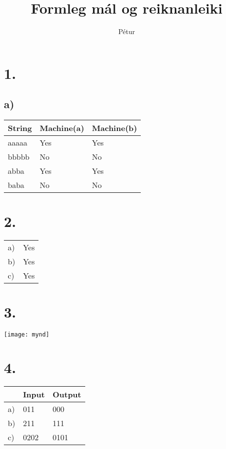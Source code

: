 \documentclass[]{article}
\begin{document}
\title{Formleg mál og reiknanleiki}
\author{Pétur}
\maketitle

\section*{1.}

\subsection*{a)}

\begin{tabular}{ l|l|l }
  String & Machine(a) & Machine(b) \\ \hline
  aaaaa & 	Yes 	& Yes \\
  bbbbb  & 	No	 	& No \\
  abba	&	Yes		& Yes \\
  baba	&	No		& No 
\end{tabular}

\section*{2.}

\begin{tabular}{ll}
a) & Yes \\
b) & Yes \\
c) & Yes 
\end{tabular}

\section*{3.}

\texttt{[image: mynd]}

\section*{4.}

\begin{tabular}{l|l|l}
	&	Input	&	Output 	\\ \hline
a)	&	011		&	000 	\\ \hline
b) 	& 	211		&	111 	\\ \hline
c)	&	0202	&	0101	\\
\end{tabular}
\end{document}

